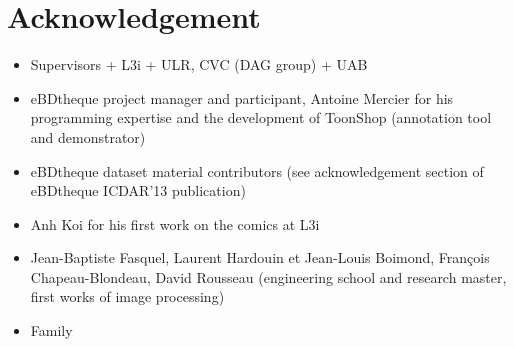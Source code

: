 \chapter*{Acknowledgement}
\begin{itemize}
	\item Supervisors + L3i + ULR, CVC (DAG group) + UAB
	\item eBDtheque project manager and participant, Antoine Mercier for his programming expertise and the development of ToonShop (annotation tool and demonstrator)
	\item eBDtheque dataset material contributors (see acknowledgement section of eBDtheque ICDAR'13 publication)
	\item Anh Koi for his first work on the comics at L3i
	\item Jean-Baptiste Fasquel, Laurent Hardouin et Jean-Louis Boimond, François Chapeau-Blondeau, David Rousseau (engineering school and research master, first works of image processing)
	\item Family
\end{itemize}
\clearpage\thispagestyle{empty}